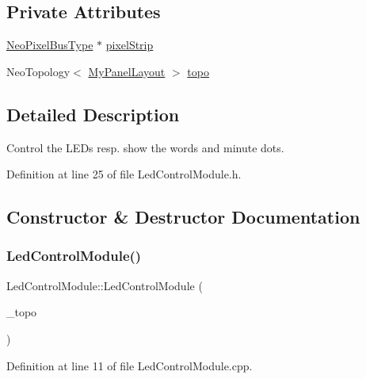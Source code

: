 \subsection*{Private Attributes}
\begin{DoxyCompactItemize}
\item 
\mbox{\hyperlink{_led_control_module_8h_a51a7b766d62733fca1ec20e82e024f9f}{Neo\+Pixel\+Bus\+Type}} $\ast$ \mbox{\hyperlink{class_led_control_module_a9d427e447c0cfb34b154f464e7682e14}{pixel\+Strip}}
\item 
Neo\+Topology$<$ \mbox{\hyperlink{_led_control_module_8h_a49b2323848e516b3241e758de64f0b3b}{My\+Panel\+Layout}} $>$ \mbox{\hyperlink{class_led_control_module_a0b71b57d3f564529c89be8877dbfaa6b}{topo}}
\end{DoxyCompactItemize}


\subsection{Detailed Description}
Control the L\+E\+Ds resp. show the words and minute dots. 

Definition at line 25 of file Led\+Control\+Module.\+h.



\subsection{Constructor \& Destructor Documentation}
\mbox{\label{class_led_control_module_a5a653e4a322f618a6937449fafe959bb}} 
\subsubsection{\texorpdfstring{LedControlModule()}{LedControlModule()}}
{\footnotesize\ttfamily Led\+Control\+Module\+::\+Led\+Control\+Module (\begin{DoxyParamCaption}\item[{Neo\+Topology$<$ \mbox{\hyperlink{_led_control_module_8h_a49b2323848e516b3241e758de64f0b3b}{My\+Panel\+Layout}} $>$}]{\+\_\+topo }\end{DoxyParamCaption})}



Definition at line 11 of file Led\+Control\+Module.\+cpp.

